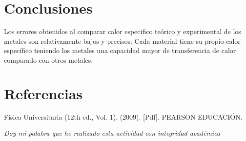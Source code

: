 \documentclass[a4paper,12pt]{article}
\begin{document}

\section*{Conclusiones}
Los errores obtenidos al comparar calor especifico teórico y experimental de los metales son relativamente bajos y precisos. Cada material tiene su propio calor específico teniendo los metales una capacidad mayor de transferencia de calor comparado con otros metales.

\section*{Referencias}
Fisica Universitaria (12th ed., Vol. 1). (2009). [Pdf]. PEARSON EDUCACIÓN.

\textit{Doy mi palabra que he realizado esta actividad con integridad académica}
\end{document}
